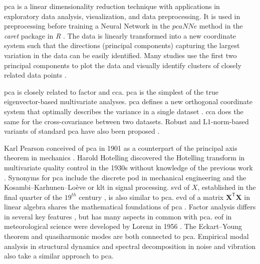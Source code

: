 \documentclass[sn-mathphys-num]{sn-jnl}%
\begin{document}
\acrfull{pca} is a linear dimensionality reduction technique with applications in exploratory data analysis, visualization, and data preprocessing. It is used in preprocessing before training a Neural Network in the $pcaNNe$ method in the \textit{caret} package in \textit{R} \cite{ripley2007pattern}. The data is linearly transformed into a new coordinate system such that the directions (principal components) capturing the largest variation in the data can be easily identified. Many studies use the first two principal components to plot the data and visually identify clusters of closely related data points \cite{jolliffe2016principal}.

\acrshort{pca} is closely related to factor and \acrfull{cca}. \acrshort{pca} is the simplest of the true eigenvector-based multivariate analyses. \acrshort{pca} defines a new orthogonal coordinate system that optimally describes the variance in a single dataset \cite{barnett1987origins, hsu2012spectral, markopoulos2017efficient, chachlakis2019l1}. \acrshort{cca} does the same for the cross-covariance between two datasets. Robust and L1-norm-based variants of standard \acrshort{pca} have also been proposed \cite{chachlakis2019l1, markopoulos2014optimal, zhan2015robust, ke2005robust}.

Karl Pearson \cite{pearson1901liii} conceived of \acrshort{pca} in 1901 as a counterpart of the principal axis theorem in mechanics \cite{stewart2019introduction}. Harold Hotelling discovered the Hotelling transform in multivariate quality control in the 1930s without knowledge of the previous work \cite{hotelling1933analysis, hotelling1992relations}. Synonyms for \acrshort{pca} include the discrete \acrfull{pod} \cite{berkooz1993proper, karhunen1946spektraltheorie, loeve1977elementary, sirovich1987turbulence} in mechanical engineering and the Kosambi–Karhunen–Loève or \acrfull{klt} \cite{sapatnekar2011overcoming, ghoman2012pod, archiveKarhunenLoeveTransform, giambartolomei2016, mallat1999wavelet, tang1998texture} in signal processing. \acrfull{svd} of $X$, established in the final quarter of the $19^{th}$ century \cite{stewart1993early}, is also similar to \acrshort{pca}. \acrfull{evd} of a matrix $\mathbf{X}^{\mathsf{T}}\mathbf{X}$ in linear algebra shares the mathematical foundations of \acrshort{pca} \cite{gloub1996matrix, hayden2002observations}. Factor analysis differs in several key features \cite{jolliffe2002principal}, but has many aspects in common with \acrshort{pca}. \acrfull{eof} \cite{lorenz1956empirical} in meteorological science were developed by Lorenz in 1956 \cite{lorenz1956empirical}. The Eckart–Young theorem \cite{eckart1936approximation} and quasiharmonic modes \cite{dove1993introduction} are both connected to \acrshort{pca}. Empirical modal analysis in structural dynamics and spectral decomposition in noise and vibration also take a similar approach to \acrshort{pca}.
\end{document}
